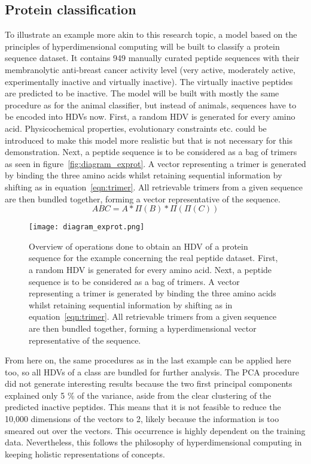 \subsection*{Protein classification}
\label{ssec:protclas}
To illustrate an example more akin to this research topic, a model based on the principles of hyperdimensional computing will be built to classify a protein sequence dataset\cite{anticancer}. It contains 949 manually curated peptide sequences with their membranolytic anti-breast cancer activity level (very active, moderately active, experimentally inactive and virtually inactive). The virtually inactive peptides are predicted to be inactive. The model will be built with mostly the same procedure as for the animal classifier, but instead of animals, sequences have to be encoded into HDVs now. First, a random HDV is generated for every amino acid. Physicochemical properties, evolutionary constraints etc. could be introduced to make this model more realistic but that is not necessary for this demonstration. Next, a peptide sequence is to be considered as a bag of trimers as seen in figure~\ref{fig:diagram_exprot}. A vector representing a trimer is generated by binding the three amino acids whilst retaining sequential information by shifting as in equation~\ref{eqn:trimer}. All retrievable trimers from a given sequence are then bundled together, forming a vector representative of the sequence. 
\begin{equation}\label{eqn:trimer}
    ABC = A * \Pi (B) * \Pi (\Pi (C))
\end{equation}
\begin{figure}[h]
    \centering
    \texttt{[image: diagram\_exprot.png]}
    \caption{Overview of operations done to obtain an HDV of a protein sequence for the example concerning the real peptide dataset. First, a random HDV is generated for every amino acid. Next, a peptide sequence is to be considered as a bag of trimers. A vector representing a trimer is generated by binding the three amino acids whilst retaining sequential information by shifting as in equation~\ref{eqn:trimer}. All retrievable trimers from a given sequence are then bundled together, forming a hyperdimensional vector representative of the sequence.}
    \label{fig:diagram_exprot5}
\end{figure}
From here on, the same procedures as in the last example can be applied here too, so all HDVs of a class are bundled for further analysis. The PCA procedure did not generate interesting results because the two first principal components explained only 5 \% of the variance, aside from the clear clustering of the predicted inactive peptides. This means that it is not feasible to reduce the 10,000 dimensions of the vectors to 2, likely because the information is too smeared out over the vectors. This occurrence is highly dependent on the training data. Nevertheless, this follows the philosophy of hyperdimensional computing in keeping holistic representations of concepts.

